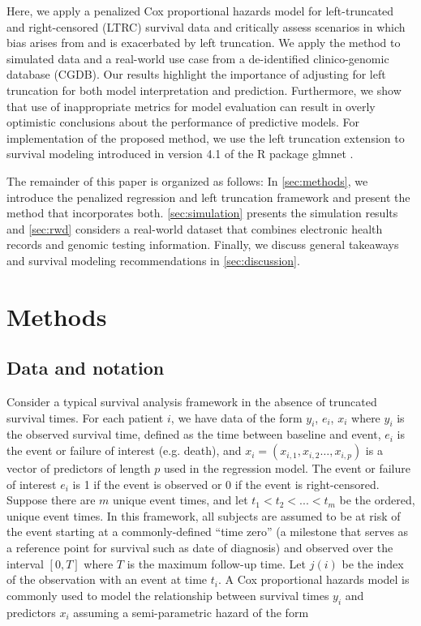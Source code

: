 \documentclass[11pt,final,fleqn]{article}\usepackage[]{graphicx}\usepackage[]{color}
\theoremstyle{plain}
\newcommand{\pkg}[1]{{\fontseries{b}\selectfont #1}}
\begin{document}
Here, we apply a penalized Cox proportional hazards model for left-truncated and right-censored (LTRC) survival data and critically assess scenarios in which bias arises from and is exacerbated by left truncation. We apply the method to simulated data and a real-world use case from a de-identified clinico-genomic database (CGDB). Our results highlight the importance of adjusting for left truncation for both model interpretation and prediction. Furthermore, we show that use of inappropriate metrics for model evaluation can result in overly optimistic conclusions about the performance of predictive models. For implementation of the proposed method, we use the left truncation extension to survival modeling introduced in version 4.1 of the \textsf{R} package \pkg{glmnet} \cite{glmnet}. 

The remainder of this paper is organized as follows: In \autoref{sec:methods}, we introduce the penalized regression and left truncation framework and present the method that incorporates both. \autoref{sec:simulation} presents the simulation results and \autoref{sec:rwd} considers a real-world dataset that combines electronic health records and genomic testing information. Finally, we discuss general takeaways and survival modeling recommendations in \autoref{sec:discussion}. 

\section{Methods} \label{sec:methods}

\subsection{Data and notation} 
Consider a typical survival analysis framework in the absence of truncated survival times. For each patient $i$, we have data of the form $y_i$, $e_i$, $x_i$ where $y_i$ is the observed survival time, defined as the time between baseline and event, $e_i$ is the event or failure of interest (e.g. death), and $x_i = (x_{i,1}, x_{i,2} \ldots, x_{i,p})$ is a vector of predictors of length $p$ used in the regression model. The event or failure of interest $e_i$ is 1 if the event is observed or 0 if the event is right-censored. Suppose there are $m$ unique event times, and let $t_1 < t_2 < ... < t_m$ be the ordered, unique event times. In this framework, all subjects are assumed to be at risk of the event starting at a commonly-defined ``time zero'' (a milestone that serves as a reference point for survival such as date of diagnosis) and observed over the interval $[0,T]$ where $T$ is the maximum follow-up time. Let $j(i)$ be the index of the observation with an event at time $t_i$. A Cox proportional hazards model is commonly used to model the relationship between survival times $y_i$ and predictors $x_i$ assuming a semi-parametric hazard of the form
\end{document}
